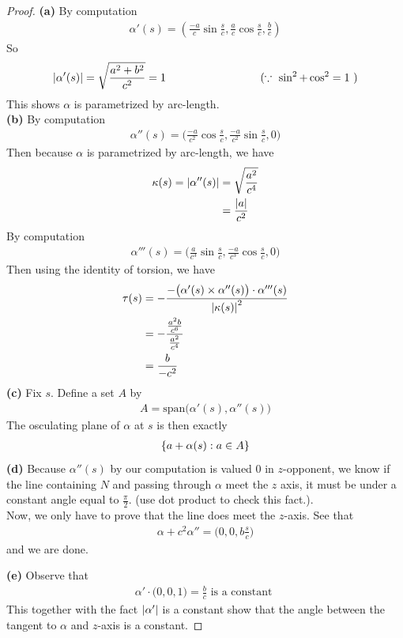 \documentclass{report}
\begin{document}
\begin{proof}
\textbf{(a)}
By computation 
\begin{align*}
\alpha '(s)=(\frac{-a}{c} \sin \frac{s}{c},\frac{a}{c}\cos \frac{s}{c},\frac{b}{c}) 
\end{align*}
So 
\begin{align*}
\abso{\alpha '(s)}=\sqrt{\frac{a^2+b^2}{c^2}}=1\hspace{3cm}(\because \text{ $\sin^2+\cos^2=1$ })
\end{align*}
This shows $\alpha $ is parametrized by arc-length.\\

\textbf{(b)}
By computation 
\begin{align*}
\alpha ''(s)=\Big(\frac{-a}{c^2} \cos \frac{s}{c}, \frac{-a}{c^2} \sin \frac{s}{c},0\Big)
\end{align*}
Then because $\alpha $ is parametrized by arc-length, we have 
\begin{align*}
\kappa(s)=\left|\alpha ''(s)\right|&= \sqrt{\frac{a^2}{c^4}}\\
&=\frac{\left|a\right|}{c^2}
\end{align*}
By computation 
\begin{align*}
\alpha '''(s)=\Big(\frac{a}{c^3}\sin \frac{s}{c}, \frac{-a}{c^3} \cos \frac{s}{c},0 \Big)
\end{align*}
Then using the identity of torsion, we have 
\begin{align*}
\tau (s)&=- \frac{- \big(\alpha '(s)\times \alpha ''(s) \big)\cdot \alpha '''(s)}{\left|\kappa (s)\right|^2}\\
&=-\frac{\frac{a^2b}{c^6}}{\frac{a^2}{c^4}}\\
&=\frac{b}{-c^2}
\end{align*}
\textbf{(c)}
Fix $s$. Define a set $A$  by 
\begin{align*}
A=\text{span}\Big(\alpha '(s),\alpha ''(s) \Big)
\end{align*}
The osculating plane of $\alpha $ at $s$ is then exactly 
\begin{align*}
\{ a+\alpha (s): a \in A \}
\end{align*}
\textbf{(d)}
Because $\alpha ''(s)$ by our computation is valued $0$ in  $z$-opponent, we know if the line containing  $N$ and passing through $\alpha $ meet the $z$ axis, it must be under a constant angle equal to  $\frac{\pi}{2}$. (use dot product to check this fact.).\\

Now, we only have to prove that the line does meet the $z$-axis. See that 
\begin{align*}
\alpha + c^2 \alpha ''=\Big(0,0,b\frac{s}{c} \Big)
\end{align*}
and we are done.

\textbf{(e)}
Observe that 
\begin{align*}
\alpha ' \cdot \Big(0,0,1 \Big)=\frac{b}{c}\text{ is a constant }
\end{align*}
This together with the fact $\left|\alpha '\right|$ is a constant show that the angle between the tangent to $\alpha $ and $z$-axis is a constant.

\end{proof}
\end{document}
